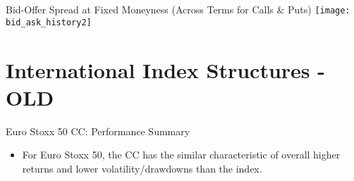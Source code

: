 \documentclass{beamer}
\begin{document}
\begin{frame}{\large Bid-Offer Spread at Fixed Moneyness (Across Terms for Calls \& Puts)}
\texttt{[image: bid\_ask\_history2]}
\end{frame}

\section{International Index Structures - OLD}

\begin{frame}{Euro Stoxx 50 CC: Performance Summary}
\begin{itemize}
\item For Euro Stoxx 50, the CC has the similar characteristic of overall higher returns and lower volatility/drawdowns than the index.


\end{itemize}
\end{frame}
\end{document}
